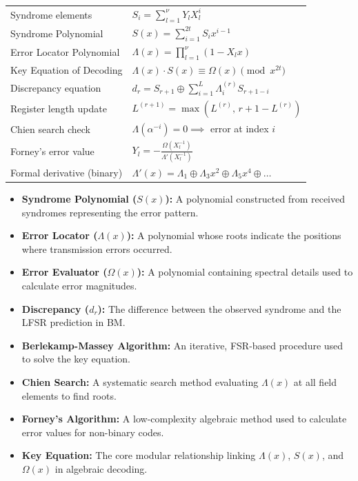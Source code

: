 \documentclass[12pt,a4paper]{article}
\renewcommand{\arraystretch}{1.45}
\begin{document}
\begin{tcolorbox}[formulabox, title={\textbf{Key Formulas and Metrics at a Glance}}]
\renewcommand{\arraystretch}{1.35}
\begin{tabularx}{\linewidth}{B{5.0cm} X}
Syndrome elements & $S_i = \sum_{l=1}^\nu Y_l X_l^i$ \\[4pt]
Syndrome Polynomial & $S(x) = \sum_{i=1}^{2t} S_i x^{i-1}$ \\[4pt]
Error Locator Polynomial & $\Lambda(x) = \prod_{l=1}^\nu (1 - X_l x)$ \\[4pt]
Key Equation of Decoding & $\Lambda(x) \cdot S(x) \equiv \Omega(x) \pmod{x^{2t}}$ \\[4pt]
Discrepancy equation & $d_r = S_{r+1} \oplus \sum_{i=1}^L \Lambda_i^{(r)} S_{r+1-i}$ \\[4pt]
Register length update & $L^{(r+1)} = \max \left( L^{(r)}, \, r + 1 - L^{(r)} \right)$ \\[4pt]
Chien search check & $\Lambda(\alpha^{-i}) = 0 \implies$ error at index $i$ \\[4pt]
Forney's error value & $Y_l = - \frac{\Omega(X_l^{-1})}{\Lambda'(X_l^{-1})}$ \\[4pt]
Formal derivative (binary) & $\Lambda'(x) = \Lambda_1 \oplus \Lambda_3 x^2 \oplus \Lambda_5 x^4 \oplus \dots$
\end{tabularx}
\end{tcolorbox}

\vspace{6pt}

\begin{tcolorbox}[defbox, title={\textbf{One-Line Definitions}}]
\begin{itemize}[leftmargin=*, itemsep=3pt, topsep=0pt]
  \item \textbf{Syndrome Polynomial ($S(x)$):} A polynomial constructed from received syndromes representing the error pattern.
  \item \textbf{Error Locator ($\Lambda(x)$):} A polynomial whose roots indicate the positions where transmission errors occurred.
  \item \textbf{Error Evaluator ($\Omega(x)$):} A polynomial containing spectral details used to calculate error magnitudes.
  \item \textbf{Discrepancy ($d_r$):} The difference between the observed syndrome and the LFSR prediction in BM.
  \item \textbf{Berlekamp-Massey Algorithm:} An iterative, FSR-based procedure used to solve the key equation.
  \item \textbf{Chien Search:} A systematic search method evaluating $\Lambda(x)$ at all field elements to find roots.
  \item \textbf{Forney's Algorithm:} A low-complexity algebraic method used to calculate error values for non-binary codes.
  \item \textbf{Key Equation:} The core modular relationship linking $\Lambda(x)$, $S(x)$, and $\Omega(x)$ in algebraic decoding.
\end{itemize}
\end{tcolorbox}
\end{document}
